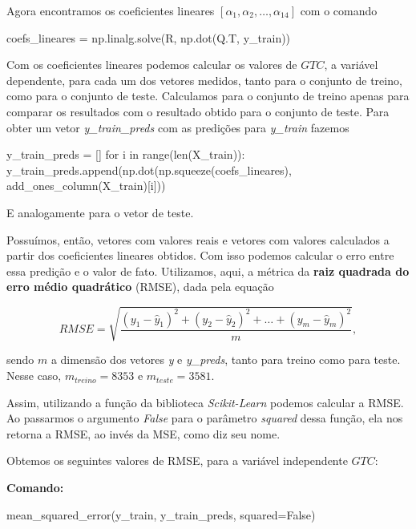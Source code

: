 \documentclass[a4paper, 12pt]{article}
\theoremstyle{definition}
\theoremstyle{remark}
\begin{document}
Agora encontramos os coeficientes lineares $[\alpha_1, \alpha_2, \ldots, \alpha_{14}]$ com o comando
    
\begin{python}
coefs_lineares = np.linalg.solve(R, np.dot(Q.T, y_train))
\end{python}
    
Com os coeficientes lineares podemos calcular os valores de $GTC$, a variável dependente, para cada um dos vetores medidos, tanto para o conjunto de treino, como para o conjunto de teste. Calculamos para o conjunto de treino apenas para comparar os resultados com o resultado obtido para o conjunto de teste. Para obter um vetor \textit{y\_train\_preds} com as predições para \textit{y\_train} fazemos
    
\begin{python}
y_train_preds = []
for i in range(len(X_train)):
 y_train_preds.append(np.dot(np.squeeze(coefs_lineares), add_ones_column(X_train)[i]))
\end{python}

E analogamente para o vetor de teste.

Possuímos, então, vetores com valores reais e vetores com valores calculados a partir dos coeficientes lineares obtidos. Com isso podemos calcular o erro entre essa predição e o valor de fato. Utilizamos, aqui, a métrica da \textbf{raiz quadrada do erro médio quadrático} (RMSE), dada pela equação

\begin{equation}
\label{eqn:rmse}
RMSE = \sqrt{\frac{(y_1 - \hat{y}_1)^2 + (y_2 - \hat{y}_2)^2 + \ldots + (y_m - \hat{y}_m)^2}{m}},
\end{equation}

sendo $m$ a dimensão dos vetores \textit{y} e \textit{y\_preds}, tanto para treino como para teste. Nesse caso, $m_{treino} = 8353$ e $m_{teste} = 3581$.

Assim, utilizando a função  da biblioteca \textit{Scikit-Learn} podemos calcular a RMSE. Ao passarmos o argumento \textit{False} para o parâmetro \textit{squared} dessa função, ela nos retorna a RMSE, ao invés da MSE, como diz seu nome.

Obtemos os seguintes valores de RMSE, para a variável independente $GTC$:

\vspace{1.5cm}

\textbf{Comando:}
\begin{python}
mean_squared_error(y_train, y_train_preds, squared=False)
\end{python}
\end{document}
